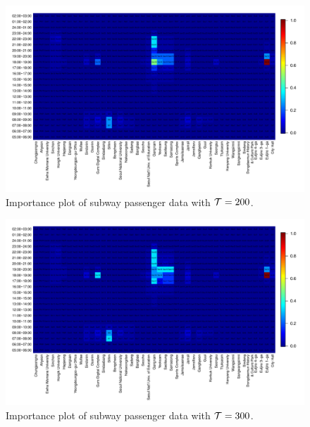 \documentclass[preprint, review, 12pt]{article}
\theoremstyle{definition}
\theoremstyle{remark}
\begin{document}
\begin{figure}
	\centering
	\includegraphics[width=1.05\textwidth]{Fig/In_scale_3.pdf}
	\vspace{-13mm}
	\caption{Importance plot of subway passenger data with ${\cal T}=200$.}
	\label{snow:subway_in_2}
\end{figure}

\begin{figure}
	\centering
	\includegraphics[width=1.05\textwidth]{Fig/In_scale_4.pdf}
	\vspace{-13mm}
	\caption{Importance plot of subway passenger data with ${\cal T}=300$.}
	\label{snow:subway_in_3}
\end{figure}
\end{document}

